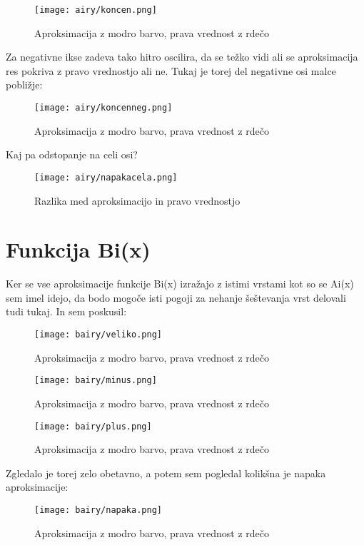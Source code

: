 \documentclass{article}
\begin{document}
\begin{figure}[H]
\texttt{[image: airy/koncen.png]}
\caption*{Aproksimacija z modro barvo, prava vrednost z rdečo}
\end{figure}

Za negativne ikse zadeva tako hitro oscilira, da se težko vidi ali se aproksimacija res pokriva z pravo vrednostjo ali ne. Tukaj je torej del negativne osi malce pobližje:

\begin{figure}[H]
\texttt{[image: airy/koncenneg.png]}
\caption*{Aproksimacija z modro barvo, prava vrednost z rdečo}
\end{figure}

Kaj pa odstopanje na celi osi?

\begin{figure}[H]
\texttt{[image: airy/napakacela.png]}
\caption*{Razlika med aproksimacijo in pravo vrednostjo}
\end{figure}

\section{Funkcija Bi(x)}

Ker se vse aproksimacije funkcije Bi(x) izražajo z istimi vrstami kot so se Ai(x) sem imel idejo, da bodo mogoče isti pogoji za nehanje šeštevanja vrst delovali
tudi tukaj. In sem poskusil:

\begin{figure}[H]
\texttt{[image: bairy/veliko.png]}
\caption*{Aproksimacija z modro barvo, prava vrednost z rdečo}
\end{figure}

\begin{figure}[H]
\texttt{[image: bairy/minus.png]}
\caption*{Aproksimacija z modro barvo, prava vrednost z rdečo}
\end{figure}

\begin{figure}[H]
\texttt{[image: bairy/plus.png]}
\caption*{Aproksimacija z modro barvo, prava vrednost z rdečo}
\end{figure}

Zgledalo je torej zelo obetavno, a potem sem pogledal kolikšna je napaka aproksimacije:

\begin{figure}[H]
\texttt{[image: bairy/napaka.png]}
\caption*{Aproksimacija z modro barvo, prava vrednost z rdečo}
\end{figure}
\end{document}
